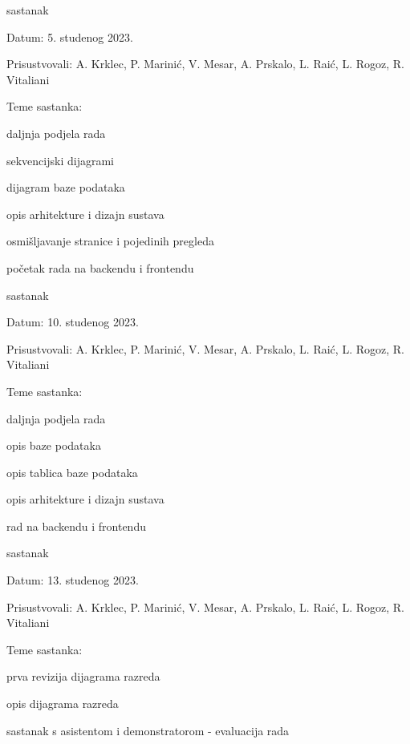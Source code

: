 \begin{packed_enum}
	\item  sastanak
	\item[] \begin{packed_item}
		\item Datum: 5. studenog 2023.
		\item Prisustvovali: A. Krklec, P. Marinić, V. Mesar, A. Prskalo, L. Raić, L. Rogoz, R. Vitaliani
		\item Teme sastanka:
		\begin{packed_item}
			\item daljnja podjela rada
			\item sekvencijski dijagrami
			\item dijagram baze podataka
			\item opis arhitekture i dizajn sustava
			\item osmišljavanje stranice i pojedinih pregleda
			\item početak rada na backendu i frontendu
		\end{packed_item}
	\end{packed_item}

	\item  sastanak
	\item[] \begin{packed_item}
		\item Datum: 10. studenog 2023.
		\item Prisustvovali: A. Krklec, P. Marinić, V. Mesar, A. Prskalo, L. Raić, L. Rogoz, R. Vitaliani
		\item Teme sastanka:
		\begin{packed_item}
			\item daljnja podjela rada
			\item opis baze podataka
			\item opis tablica baze podataka
			\item opis arhitekture i dizajn sustava
			\item rad na backendu i frontendu
		\end{packed_item}
	\end{packed_item}

	\item  sastanak
	\item[] \begin{packed_item}
		\item Datum: 13. studenog 2023.
		\item Prisustvovali: A. Krklec, P. Marinić, V. Mesar, A. Prskalo, L. Raić, L. Rogoz, R. Vitaliani
		\item Teme sastanka:
		\begin{packed_item}
			\item prva revizija dijagrama razreda
			\item opis dijagrama razreda
			\item sastanak s asistentom i demonstratorom - evaluacija rada
		\end{packed_item}
	\end{packed_item}


\end{packed_enum}
